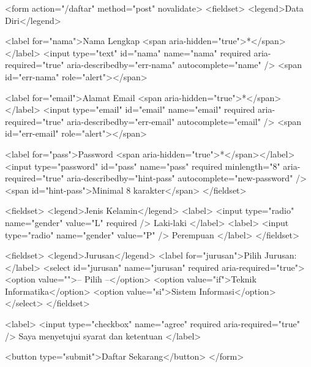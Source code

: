 \begin{webcode}[language=HTML, caption={Studi kasus: form pendaftaran aksesibel lengkap}]
<form action="/daftar" method="post" novalidate>
  <fieldset>
    <legend>Data Diri</legend>

    <label for="nama">Nama Lengkap
      <span aria-hidden="true">*</span></label>
    <input type="text" id="nama" name="nama"
           required aria-required="true"
           aria-describedby="err-nama"
           autocomplete="name" />
    <span id="err-nama" role="alert"></span>

    <label for="email">Alamat Email
      <span aria-hidden="true">*</span></label>
    <input type="email" id="email" name="email"
           required aria-required="true"
           aria-describedby="err-email"
           autocomplete="email" />
    <span id="err-email" role="alert"></span>

    <label for="pass">Password
      <span aria-hidden="true">*</span></label>
    <input type="password" id="pass" name="pass"
           required minlength="8"
           aria-required="true"
           aria-describedby="hint-pass"
           autocomplete="new-password" />
    <span id="hint-pass">Minimal 8 karakter</span>
  </fieldset>

  <fieldset>
    <legend>Jenis Kelamin</legend>
    <label>
      <input type="radio" name="gender"
             value="L" required /> Laki-laki
    </label>
    <label>
      <input type="radio" name="gender"
             value="P" /> Perempuan
    </label>
  </fieldset>

  <fieldset>
    <legend>Jurusan</legend>
    <label for="jurusan">Pilih Jurusan:</label>
    <select id="jurusan" name="jurusan" required
            aria-required="true">
      <option value="">-- Pilih --</option>
      <option value="if">Teknik Informatika</option>
      <option value="si">Sistem Informasi</option>
    </select>
  </fieldset>

  <label>
    <input type="checkbox" name="agree" required
           aria-required="true" />
    Saya menyetujui syarat dan ketentuan
  </label>

  <button type="submit">Daftar Sekarang</button>
</form>
\end{webcode}

